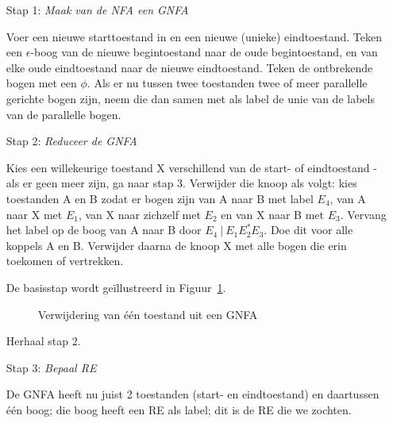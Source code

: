 \begin{itemize}
\item[Stap 1:]  {\em Maak van de NFA een GNFA} 

Voer een nieuwe starttoestand in en een nieuwe (unieke)
eindtoestand. Teken een $\epsilon$-boog van de nieuwe begintoestand naar
de oude begintoestand, en van elke oude eindtoestand naar de
nieuwe eindtoestand. Teken de ontbrekende bogen met een $\phi$.
Als er nu tussen twee toestanden twee of meer parallelle gerichte
bogen zijn, neem die dan samen met als label de unie van de labels van
de parallelle bogen.

\item[Stap 2:]  {\em Reduceer de GNFA}

Kies een willekeurige toestand X verschillend van de start- of
eindtoestand - als er geen meer zijn, ga naar stap 3. Verwijder die
knoop als volgt: kies toestanden A en B zodat er bogen zijn van A naar
B met label $E_4$, van A naar X met $E_1$, van X naar zichzelf met
$E_2$ en van X naar B met $E_3$. Vervang het label op de boog van A
naar B door $E_4~|~E_1E_2^*E_3$. Doe dit voor alle koppels A en
B. Verwijder daarna de knoop X met alle bogen die erin toekomen of
vertrekken.

De basisstap wordt ge\"{i}llustreerd in Figuur~\ref{redgfsa1}.

\begin{figure}[h]
\caption{Verwijdering van \'{e}\'{e}n toestand uit een GNFA \label{redgfsa1}}
\end{figure}

Herhaal stap 2.


\item[Stap 3:]  {\em Bepaal RE}

De GNFA heeft nu juist 2 toestanden (start- en eindtoestand) en
daartussen \'{e}\'{e}n boog; die boog heeft een RE als label; dit is
de RE die we zochten.
\end{itemize}

